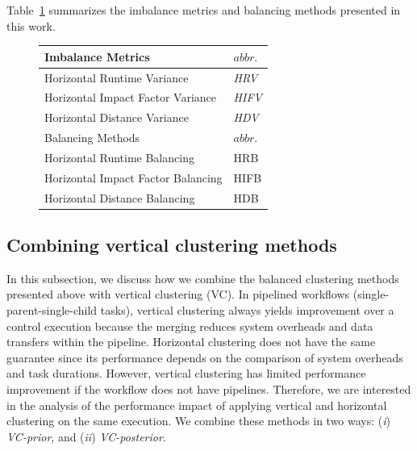 Table~\ref{tab:2} summarizes the imbalance metrics and balancing methods presented in this work. 

\begin{figure}[htb]
	\centering
	\small
	\begin{tabular}{l|l}
		\hline
		Imbalance Metrics & $abbr.$   \\
		\hline
		Horizontal Runtime Variance & \emph{HRV}   \\ 
		Horizontal Impact Factor Variance & \emph{HIFV} \\ 
		Horizontal Distance Variance & \emph{HDV}  \\ 
		\hline
		Balancing Methods & $abbr.$  \\
		\hline
		Horizontal Runtime Balancing & HRB   \\ 
		Horizontal Impact Factor Balancing & HIFB\\ 
		Horizontal Distance Balancing & HDB \\ 
		\hline
	\end{tabular}
	\label{tab:2}
\end{figure}



\subsection{Combining vertical clustering methods}

In this subsection, we discuss how we combine the balanced clustering methods presented above with vertical clustering (VC).
In pipelined workflows (single-parent-single-child tasks), vertical clustering always yields improvement over a control execution because the merging reduces system overheads and data transfers within the pipeline. Horizontal clustering does not have the same guarantee since its performance depends on the comparison of system overheads and task durations. However, vertical clustering has limited performance improvement if the workflow does not have pipelines. Therefore, we are interested in the analysis of the performance impact of applying vertical and horizontal clustering on the same execution. We combine these methods in two ways: (\emph{i}) \emph{VC-prior}, and (\emph{ii}) \emph{VC-posterior}.


